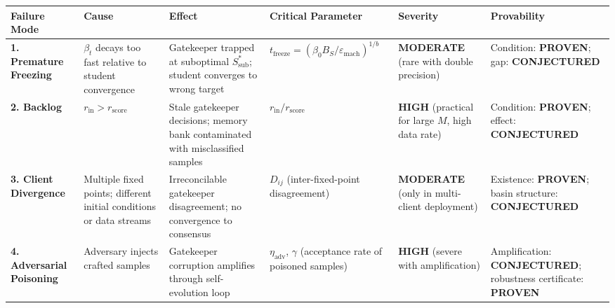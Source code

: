 \documentclass[
  12pt,
]{article}
\begin{document}
\begin{longtable}[]{@{}
  >{\raggedright\arraybackslash}p{}
  >{\raggedright\arraybackslash}p{}
  >{\raggedright\arraybackslash}p{}
  >{\raggedright\arraybackslash}p{}
  >{\raggedright\arraybackslash}p{}
  >{\raggedright\arraybackslash}p{}@{}}
\toprule\noalign{}
\begin{minipage}[b]{\linewidth}\raggedright
Failure Mode
\end{minipage} & \begin{minipage}[b]{\linewidth}\raggedright
Cause
\end{minipage} & \begin{minipage}[b]{\linewidth}\raggedright
Effect
\end{minipage} & \begin{minipage}[b]{\linewidth}\raggedright
Critical Parameter
\end{minipage} & \begin{minipage}[b]{\linewidth}\raggedright
Severity
\end{minipage} & \begin{minipage}[b]{\linewidth}\raggedright
Provability
\end{minipage} \\
\midrule\noalign{}
\endhead
\bottomrule\noalign{}
\endlastfoot
\textbf{1. Premature Freezing} & \(\beta_t\) decays too fast relative to
student convergence & Gatekeeper trapped at suboptimal
\(S^*_{\text{sub}}\); student converges to wrong target &
\(t_{\text{freeze}} = (\beta_0 B_S / \varepsilon_{\text{mach}})^{1/b}\)
& \textbf{MODERATE} (rare with double precision) & Condition:
\textbf{PROVEN}; gap: \textbf{CONJECTURED} \\
\textbf{2. Backlog} & \(r_{\text{in}} > r_{\text{score}}\) & Stale
gatekeeper decisions; memory bank contaminated with misclassified
samples & \(r_{\text{in}} / r_{\text{score}}\) & \textbf{HIGH}
(practical for large \(M\), high data rate) & Condition:
\textbf{PROVEN}; effect: \textbf{CONJECTURED} \\
\textbf{3. Client Divergence} & Multiple fixed points; different initial
conditions or data streams & Irreconcilable gatekeeper disagreement; no
convergence to consensus & \(D_{ij}\) (inter-fixed-point disagreement) &
\textbf{MODERATE} (only in multi-client deployment) & Existence:
\textbf{PROVEN}; basin structure: \textbf{CONJECTURED} \\
\textbf{4. Adversarial Poisoning} & Adversary injects crafted samples &
Gatekeeper corruption amplifies through self-evolution loop &
\(\eta_{\text{adv}}\), \(\gamma\) (acceptance rate of poisoned samples)
& \textbf{HIGH} (severe with amplification) & Amplification:
\textbf{CONJECTURED}; robustness certificate: \textbf{PROVEN} \\
\end{longtable}
\end{document}
